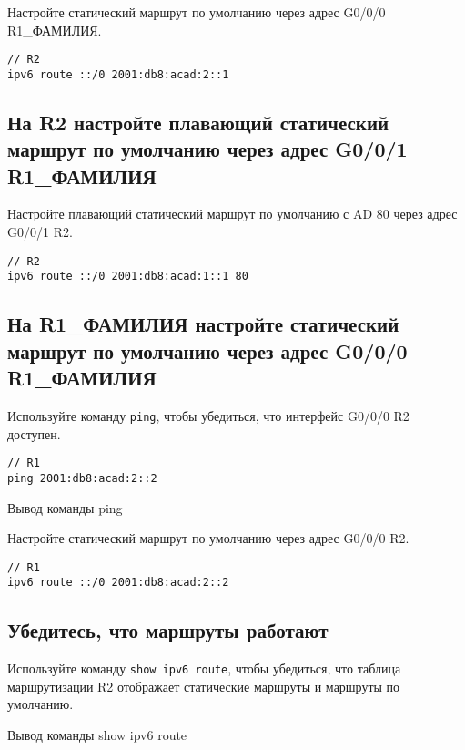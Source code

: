 Настройте статический маршрут по умолчанию через адрес G0/0/0 R1\_ФАМИЛИЯ.

\begin{verbatim}
// R2
ipv6 route ::/0 2001:db8:acad:2::1
\end{verbatim}

\subsection{На R2 настройте плавающий статический маршрут
	по умолчанию через адрес G0/0/1 R1\_ФАМИЛИЯ}

Настройте плавающий статический маршрут
по умолчанию с AD 80 через адрес G0/0/1 R2.

\begin{verbatim}
// R2
ipv6 route ::/0 2001:db8:acad:1::1 80
\end{verbatim}

\subsection{На R1\_ФАМИЛИЯ настройте статический маршрут
	по умолчанию через адрес G0/0/0 R1\_ФАМИЛИЯ}

Используйте команду \texttt{ping}, чтобы убедиться,
что интерфейс G0/0/0 R2 доступен.

\begin{verbatim}
// R1
ping 2001:db8:acad:2::2
\end{verbatim}

\begin{image}
	\caption{Вывод команды ping}
\end{image}

Настройте статический маршрут по умолчанию через адрес G0/0/0 R2.

\begin{verbatim}
// R1
ipv6 route ::/0 2001:db8:acad:2::2
\end{verbatim}

\subsection{Убедитесь, что маршруты работают}

Используйте команду \texttt{show ipv6 route}, чтобы убедиться,
что таблица маршрутизации R2 отображает статические маршруты
и маршруты по умолчанию.

\begin{image}
	\caption{Вывод команды show ipv6 route}
\end{image}

